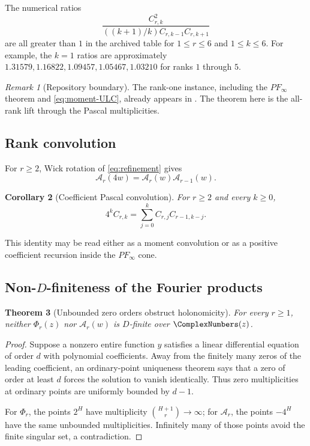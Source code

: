 \documentclass[11pt,oneside]{article}
\newtheorem{theorem}{Theorem}[section]
\newtheorem{corollary}[theorem]{Corollary}
\theoremstyle{definition}
\theoremstyle{remark}
\newtheorem{remark}[theorem]{Remark}
\newcommand{\Ar}{\mathcal A}
\begin{document}
The numerical ratios
\[
 \frac{C_{r,k}^2}{((k+1)/k)C_{r,k-1}C_{r,k+1}}
\]
are all greater than $1$ in the archived table for $1\leq r\leq6$ and
$1\leq k\leq6$.  For example, the $k=1$ ratios are approximately
$1.31579,1.16822,1.09457,1.05467,1.03210$ for ranks $1$ through $5$.

\begin{remark}[Repository boundary]
The rank-one instance, including the $PF_\infty$ theorem and
\eqref{eq:moment-ULC}, already appears in
.  The theorem here is the all-rank lift through
the Pascal multiplicities.
\end{remark}

\subsection{Rank convolution}

For $r\geq2$, Wick rotation of \eqref{eq:refinement} gives
\begin{equation}\label{eq:A-refinement}
 \Ar_r(4w)=\Ar_r(w)\Ar_{r-1}(w).
\end{equation}

\begin{corollary}[Coefficient Pascal convolution]\label{cor:C-convolution}
For $r\geq2$ and every $k\geq0$,
\begin{equation}\label{eq:C-convolution}
 4^kC_{r,k}=\sum_{j=0}^{k}C_{r,j}C_{r-1,k-j}.
\end{equation}
\end{corollary}

This identity may be read either as a moment convolution or as a positive
coefficient recursion inside the $PF_\infty$ cone.

\subsection{Non-\texorpdfstring{$D$}{D}-finiteness of the Fourier products}

\begin{theorem}[Unbounded zero orders obstruct holonomicity]\label{thm:Phi-nonD}
For every $r\geq1$, neither $\Phi_r(z)$ nor $\Ar_r(w)$ is $D$-finite over
$\ComplexNumbers(z)$.
\end{theorem}

\begin{proof}
Suppose a nonzero entire function $y$ satisfies a linear differential equation
of order $d$ with polynomial coefficients.  Away from the finitely many zeros
of the leading coefficient, an ordinary-point uniqueness theorem says that a
zero of order at least $d$ forces the solution to vanish identically.  Thus
zero multiplicities at ordinary points are uniformly bounded by $d-1$.

For $\Phi_r$, the points $2^H$ have multiplicity
$\binom{H+1}{r}\to\infty$; for $\Ar_r$, the points $-4^H$ have the same
unbounded multiplicities.  Infinitely many of those points avoid the finite
singular set, a contradiction.
\end{proof}
\end{document}
